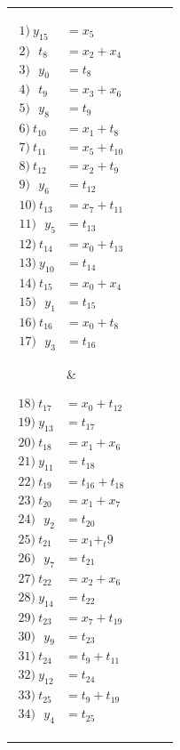 {\begin{tabular}{| c c | c c |}
\parbox{0.2\linewidth}{%
\begin{align*}
1)\:y_{15} & =  x_5\\ 
2)\:\:\:t_{8} & =  x_2 + x_4\\ 
3)\:\:\:y_{0} & =  t_8\\ 
4)\:\:\:t_{9} & =  x_3 + x_6\\ 
5)\:\:\:y_{8} & =  t_9\\ 
6)\:t_{10} & =  x_1 + t_8\\ 
7)\:t_{11} & =  x_5 + t_{10}\\ 
8)\:t_{12} & =  x_2 + t_9\\ 
9)\:\:\:y_6 & =  t_{12}\\ 
10)\:t_{13} & =  x_7 + t_{11}\\ 
11)\:\:\:y_5 & =  t_{13}\\ 
12)\:t_{14} & =  x_0 + t_{13}\\ 
13)\:y_{10} & =  t_{14}\\ 
14)\:t_{15} & =  x_0 + x_4\\ 
15)\:\:\:y_1 & =  t_{15}\\ 
16)\:t_{16} & =  x_0 + t_8 \\
17)\:\:\:y_3 & =  t_{16}
\end{align*}}
    & 
\parbox{0.2\linewidth}{%
\begin{align*}
18)\:t_{17} & =  x_0 + t_{12}\\
19)\:y_{13} & =  t_{17}\\ 
20)\:t_{18} & =  x_1 + x_6\\ 
21)\:y_{11} & =  t_{18}\\ 
22)\:t_{19} & =  t_{16} + t_{18}\\ 
23)\:t_{20} & =  x_1 + x_7\\ 
24)\:\:\:y_2 & =  t_{20}\\ 
25)\:t_{21} & =  x_1 + _t9\\ 
26)\:\:\:y_7 & =  t_{21}\\ 
27)\:t_{22} & =  x_2 + x_6\\ 
28)\:y_{14} & =  t_{22}\\ 
29)\:t_{23} & =  x_7 + t_{19}\\ 
30)\:\:\:y_9 & =  t_{23}\\ 
31)\:t_{24} & =  t_9 + t_{11}\\ 
32)\:y_{12} & =  t_{24}\\ 
33)\:t_{25} & =  t_9 + t_{19}\\ 
34)\:\:\:y_4 & =  t_{25}
\end{align*}} \\ \hline
{} &  \\ \hline
\end{tabular}
}

